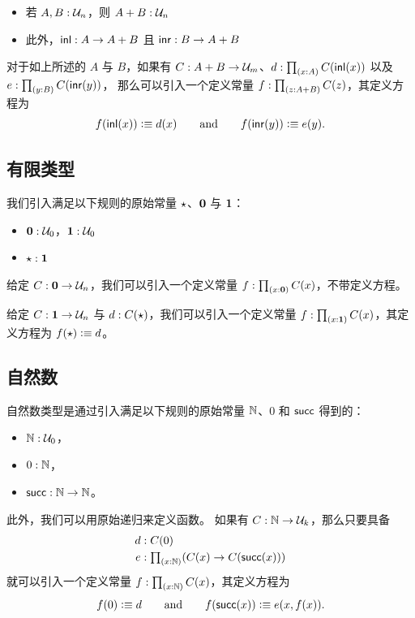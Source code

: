 \begin{itemize}
\item 若 $A,B : \mathcal{U}_n$，则 $A + B : \mathcal{U}_n$
\item 此外，${\mathsf{inl}}: A \rightarrow A+B$ 且 ${\mathsf{inr}}: B \rightarrow A+B$
\end{itemize}


%
对于如上所述的 $A$ 与 $B$，如果有 $C : A+B \rightarrow \mathcal{U}_m$、$d:\tprd{x:A} C(\inl(x))$ 以及 $e:\tprd{y:B} C(\inr(y))$，
那么可以引入一个定义常量 $f:\tprd{z:A+B}C(z)$，其定义方程为
%
\begin{equation*}
  f({\mathsf{inl}}(x)) \vcentcolon\equiv d(x)
  \qquad\text{and}\qquad
  f({\mathsf{inr}}(y)) \vcentcolon\equiv e(y).
\end{equation*}

\subsection{有限类型}

我们引入满足以下规则的原始常量 $\star$、$\mathbf{0}$ 与 $\mathbf{1}$：
%


\begin{itemize}
\item $\mathbf{0} : \mathcal{U}_0$，$\mathbf{1} : \mathcal{U}_0$
\item $\star:\mathbf{1}$
\end{itemize}

给定 $C : \mathbf{0} \rightarrow \mathcal{U}_n$，我们可以引入一个定义常量 $f:\tprd{x:\emptyt} C(x)$，不带定义方程。

给定 $C : \mathbf{1} \rightarrow \mathcal{U}_n$ 与 $d : C(\star)$，我们可以引入一个定义常量 $f:\tprd{x:\unit} C(x)$，其定义方程为 $f(\star) \vcentcolon\equiv d$。

\subsection{自然数}

自然数类型是通过引入满足以下规则的原始常量 $\mathbb{N}$、$0$ 和 $\mathsf{succ}$ 得到的：
%


\begin{itemize}
  \item $\mathbb{N} : \mathcal{U}_0$，
  \item $0:\mathbb{N}$，
  \item $\mathsf{succ}:\mathbb{N}\rightarrow \mathbb{N}$。
\end{itemize}


%
此外，我们可以用原始递归来定义函数。
如果有 $C : \mathbb{N} \rightarrow \mathcal{U}_k $，那么只要具备
%
\begin{align*}
  d & : C(0) \\
  e & : \tprd{x:\N}(C(x)\rightarrow C(\suc (x)))
\end{align*}
%
就可以引入一个定义常量 $f:\tprd{x:\N}C(x)$，其定义方程为
%
\begin{equation*}
  f(0) \vcentcolon\equiv d
  \qquad\text{and}\qquad
  f(\mathsf{succ} (x)) \vcentcolon\equiv e(x,f(x)).
\end{equation*}

